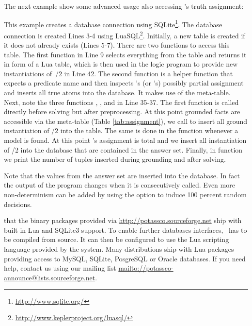 \begin{example}
The next example show some advanced usage also accessing \clasp's truth assignment:

This example creates a database connection using SQLite\footnote{\url{http://www.sqlite.org/}}.
The database connection is created Lines 3-4 using LuaSQL\footnote{\url{http://www.keplerproject.org/luasql/}}.
Initially, a new table  is created if it does not already exists (Lines 5-7).
There are two functions to access this table.
The first function  in Line 9 selects everything from the table and 
returns it in form of a Lua table, which is then used in the logic program
to provide new instantiations of~/$2$ in Line 42.
The second function  is a helper function that expects a predicate name
and then inspects \clingo's (or \iclingo's) possibly partial assignment and
inserts all true atoms into the database.
It makes use of the  meta-table.
Next, note the three functions
,
, and
in Line 35-37.
The first function is called directly before solving but after preprocessing.
At this point grounded facts are accessible via the  meta-table (Table \ref{tab:assignment}),
we call  to insert all ground instantiation of /$2$ into the  table.
The same is done in the  function whenever a model is found.
At this point \clingo's assignment is total and 
we insert all instantiation of /2 into the database that are contained in the answer set.
Finally, in function  we print the number of tuples inserted during grounding and after solving.

Note that the values from the answer set are inserted into the database.
In fact the output of the program changes when it is consecutively called.
Even more non-determinism can be added by using the option 
to induce 100 percent random decisions.
\eexample
\end{example}

\begin{Note}
	that the binary packages provided via \url{http://potassco.sourceforge.net} ship with built-in Lua and SQLite3 support.
	To enable further databases interfaces,	\gringo\ has to be compiled from source. 
	It can then be configured to use the Lua scripting language provided by the system. 
	Many distributions ship with Lua packages providing access to MySQL, SQLite, PosgreSQL or Oracle databases.
	If you need help, contact us using our mailing list \url{mailto://potassco-announce@lists.sourceforge.net}.
\end{Note}



